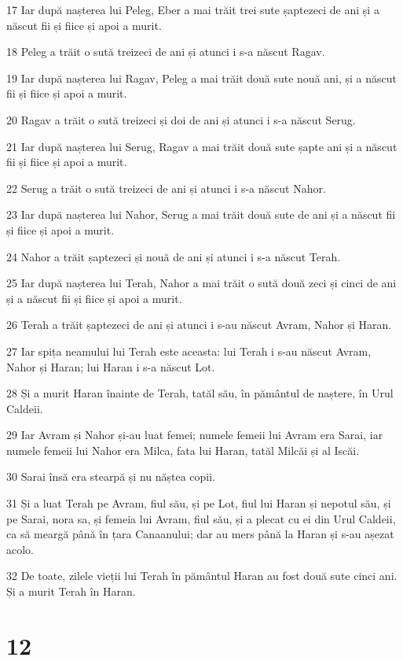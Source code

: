 \par 17 Iar după nașterea lui Peleg, Eber a mai trăit trei sute șaptezeci de ani și a născut fii și fiice și apoi a murit.
\par 18 Peleg a trăit o sută treizeci de ani și atunci i s-a născut Ragav.
\par 19 Iar după nașterea lui Ragav, Peleg a mai trăit două sute nouă ani, și a născut fii și fiice și apoi a murit.
\par 20 Ragav a trăit o sută treizeci și doi de ani și atunci i s-a născut Serug.
\par 21 Iar după nașterea lui Serug, Ragav a mai trăit două sute șapte ani și a născut fii și fiice și apoi a murit.
\par 22 Serug a trăit o sută treizeci de ani și atunci i s-a născut Nahor.
\par 23 Iar după nașterea lui Nahor, Serug a mai trăit două sute de ani și a născut fii și fiice și apoi a murit.
\par 24 Nahor a trăit șaptezeci și nouă de ani și atunci i s-a născut Terah.
\par 25 Iar după nașterea lui Terah, Nahor a mai trăit o sută două zeci și cinci de ani și a născut fii și fiice și apoi a murit.
\par 26 Terah a trăit șaptezeci de ani și atunci i s-au născut Avram, Nahor și Haran.
\par 27 Iar spița neamului lui Terah este aceasta: lui Terah i s-au născut Avram, Nahor și Haran; lui Haran i s-a născut Lot.
\par 28 Și a murit Haran înainte de Terah, tatăl său, în pământul de naștere, în Urul Caldeii.
\par 29 Iar Avram și Nahor și-au luat femei; numele femeii lui Avram era Sarai, iar numele femeii lui Nahor era Milca, fata lui Haran, tatăl Milcăi și al Iscăi.
\par 30 Sarai însă era stearpă și nu năștea copii.
\par 31 Și a luat Terah pe Avram, fiul său, și pe Lot, fiul lui Haran și nepotul său, și pe Sarai, nora sa, și femeia lui Avram, fiul său, și a plecat cu ei din Urul Caldeii, ca să meargă până în țara Canaanului; dar au mers până la Haran și s-au așezat acolo.
\par 32 De toate, zilele vieții lui Terah în pământul Haran au fost două sute cinci ani. Și a murit Terah în Haran.

\chapter{12}

